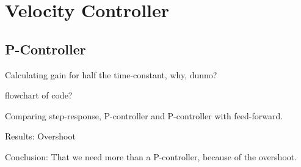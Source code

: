 \section{Velocity Controller}


\subsection{P-Controller}

Calculating gain for half the time-constant, why, dunno?

flowchart of code?

Comparing step-response, P-controller and P-controller with feed-forward.
 
Results:
Overshoot

Conclusion: 
That we need more than a P-controller, because of the overshoot. 
